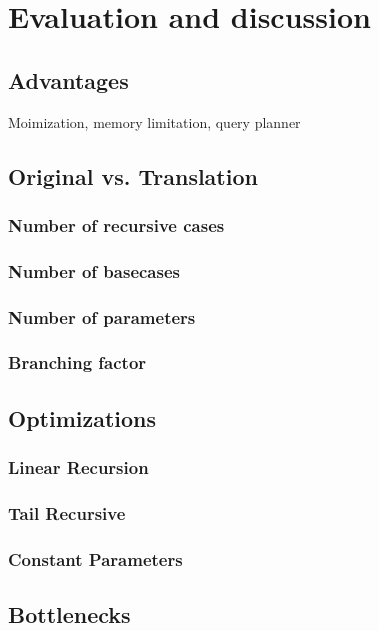 \chapter{Evaluation and discussion}\label{results_discussion}
\section{Advantages} Moimization, memory limitation, query planner
\section{Original vs. Translation}
\subsection{Number of recursive cases}
\subsection{Number of basecases}
\subsection{Number of parameters}
\subsection{Branching factor}

\section{Optimizations}
\subsection{Linear Recursion}
\subsection{Tail Recursive}
\subsection{Constant Parameters}

\section{Bottlenecks}
